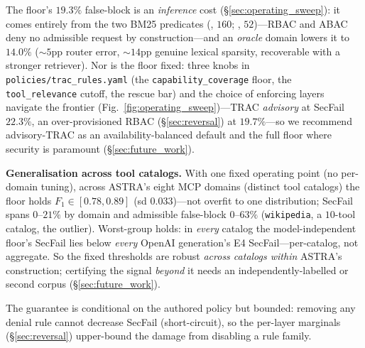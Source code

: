 \documentclass[sigconf,review,anonymous]{acmart}
\begin{document}
The floor's $19.3\%$ false-block is an \emph{inference} cost (\S\ref{sec:operating_sweep}): it comes entirely from the two BM25 predicates (, $160$; , $52$)---RBAC and ABAC deny no admissible request by construction---and an \emph{oracle} domain lowers it to $14.0\%$ ($\sim\!5$pp router error, $\sim\!14$pp genuine lexical sparsity, recoverable with a stronger retriever). Nor is the floor fixed: three knobs in \texttt{policies/trac\_rules.yaml} (the \texttt{capability\_coverage} floor, the \texttt{tool\_relevance} cutoff, the rescue bar) and the choice of enforcing layers navigate the frontier (Fig.~\ref{fig:operating_sweep})---TRAC \emph{advisory} at SecFail $22.3\%$, an over-provisioned RBAC (\S\ref{sec:reversal}) at $19.7\%$---so we recommend advisory-TRAC as an availability-balanced default and the full floor where security is paramount (\S\ref{sec:future_work}).

\textbf{Generalisation across tool catalogs.} With one fixed operating point (no per-domain tuning), across ASTRA's eight MCP domains (distinct tool catalogs) the floor holds $F_1\in[0.78,0.89]$ (sd $0.033$)---not overfit to one distribution; SecFail spans $0$--$21\%$ by domain and admissible false-block $0$--$63\%$ (\texttt{wikipedia}, a $10$-tool catalog, the outlier). Worst-group holds: in \emph{every} catalog the model-independent floor's SecFail lies below \emph{every} OpenAI generation's E4 SecFail---per-catalog, not aggregate. So the fixed thresholds are robust \emph{across catalogs within} ASTRA's construction; certifying the signal \emph{beyond} it needs an independently-labelled or second corpus (\S\ref{sec:future_work}).

The guarantee is conditional on the authored policy but bounded: removing any denial rule cannot decrease SecFail (short-circuit), so the per-layer marginals (\S\ref{sec:reversal}) upper-bound the damage from disabling a rule family.
\end{document}
